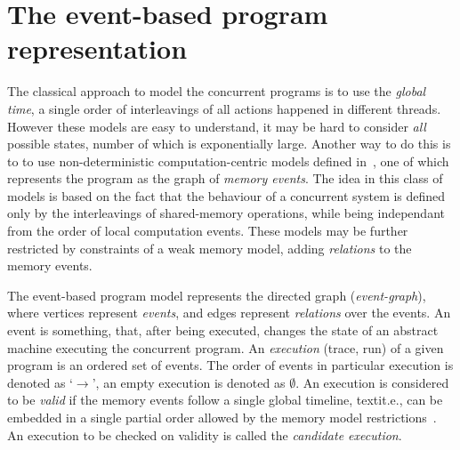 
\section{The event-based program representation}
\label{ch:wmm:event}




The classical approach to model the concurrent programs is to use the \textit{global time}, a single order of interleavings of all actions happened in different threads. However these models are easy to understand, it may be hard to consider \textit{all} possible states, number of which is exponentially large. Another way to do this is to to use non-deterministic computation-centric models defined in~\cite{fri97}, one of which represents the program as the graph of \textit{memory events}. The idea in this class of models is based on the fact that the behaviour of a concurrent system is defined only by the interleavings of shared-memory operations, while being independant from the order of local computation events. These models may be further restricted by constraints of a weak memory model, adding \textit{relations} to the memory events.

The event-based program model represents the directed graph (\textit{event-graph}), where vertices represent \textit{events}, and edges represent \textit{relations} over the events. An event is something, that, after being executed, changes the state of an abstract machine executing the concurrent program. 
An \textit{execution} (trace, run) of a given program is an ordered set of events. The order of events in particular execution is denoted as `$\rightarrow$', an empty execution is denoted as $\emptyset$.
An execution is considered to be \textit{valid} if the memory events follow a single global timeline, textit.e., can be embedded in a single partial order allowed by the memory model restrictions~\cite{alglave2010shared}. An execution to be checked on validity is called the \textit{candidate execution}.

